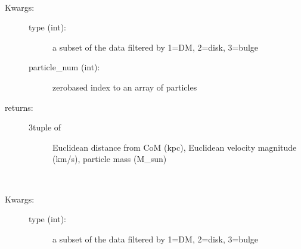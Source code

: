 \documentclass[letterpaper,10pt,english]{sphinxmanual}
\begin{document}
\begin{fulllineitems}
\begin{fulllineitems}
\end{fulllineitems}


\begin{fulllineitems}
\label{\detokenize{galaxy:galaxy.galaxy.Galaxy.single_particle_properties}}~\begin{description}
\item[{Kwargs:}] \leavevmode\begin{description}
\item[{type (int): }] \leavevmode
a subset of the data filtered by 1=DM, 2=disk, 3=bulge

\item[{particle\_num (int): }] \leavevmode
zero\sphinxhyphen{}based index to an array of particles

\end{description}

\item[{returns: }] \leavevmode\begin{description}
\item[{3\sphinxhyphen{}tuple of}] \leavevmode
Euclidean distance from CoM (kpc),
Euclidean velocity magnitude (km/s),
particle mass (M\_sun)

\end{description}

\end{description}

\end{fulllineitems}


\begin{fulllineitems}
\label{\detokenize{galaxy:galaxy.galaxy.Galaxy.all_particle_properties}}~\begin{description}
\item[{Kwargs:}] \leavevmode\begin{description}
\item[{type (int): }] \leavevmode
a subset of the data filtered by 1=DM, 2=disk, 3=bulge


\end{description}
\end{description}
\end{fulllineitems}
\end{fulllineitems}
\end{document}
